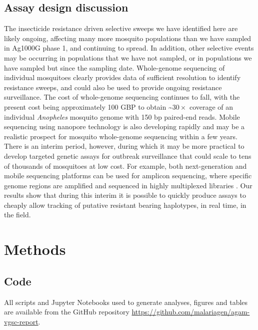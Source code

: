 \documentclass[a4paper,11pt,abstracton,hidelinks]{scrartcl}
\begin{document}
\subsection*{Assay design discussion}
The insecticide resistance driven selective sweeps we have identified here are likely ongoing, affecting many more mosquito populations than we have sampled in Ag1000G phase 1, and continuing to spread.
%
In addition, other selective events may be occurring in populations that we have not sampled, or in populations we have sampled but since the sampling date.
%
Whole-genome sequencing of individual mosquitoes clearly provides data of sufficient resolution to identify resistance sweeps, and could also be used to provide ongoing resistance surveillance.
%
The cost of whole-genome sequencing continues to fall, with the present cost being approximately 100 GBP to obtain \textasciitilde$30\times$ coverage of an individual \emph{Anopheles} mosquito genome with 150 bp paired-end reads.
%
Mobile sequencing using nanopore technology is also developing rapidly \cite{Jain2016} and may be a realistic prospect for mosquito whole-genome sequencing within a few years.
%
There is an interim period, however, during which it may be more practical to develop targeted genetic assays for outbreak surveillance that could scale to tens of thousands of mosquitoes at low cost.
%
For example, both next-generation and mobile sequencing platforms can be used for amplicon sequencing, where specific genome regions are amplified and sequenced in highly multiplexed libraries \cite{Bybee2011, Murray2015}.
%
Our results show that during this interim it is possible to quickly produce assays to cheaply allow tracking of putative resistant bearing haplotypes, in real time, in the field.




\section*{Methods}


\subsection*{Code}

%
All scripts and Jupyter Notebooks used to generate analyses, figures and tables are available from the GitHub repository \url{https://github.com/malariagen/agam-vgsc-report}. 
\end{document}

